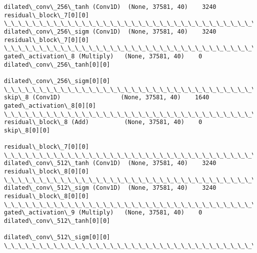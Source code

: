 \documentclass[11pt]{article}
\begin{document}
\begin{Verbatim}[commandchars=\\\{\}]
dilated\_conv\_256\_tanh (Conv1D)  (None, 37581, 40)    3240        residual\_block\_7[0][0]           
\_\_\_\_\_\_\_\_\_\_\_\_\_\_\_\_\_\_\_\_\_\_\_\_\_\_\_\_\_\_\_\_\_\_\_\_\_\_\_\_\_\_\_\_\_\_\_\_\_\_\_\_\_\_\_\_\_\_\_\_\_\_\_\_\_\_\_\_\_\_\_\_\_\_\_\_\_\_\_\_\_\_\_\_\_\_\_\_\_\_\_\_\_\_\_\_\_\_
dilated\_conv\_256\_sigm (Conv1D)  (None, 37581, 40)    3240        residual\_block\_7[0][0]           
\_\_\_\_\_\_\_\_\_\_\_\_\_\_\_\_\_\_\_\_\_\_\_\_\_\_\_\_\_\_\_\_\_\_\_\_\_\_\_\_\_\_\_\_\_\_\_\_\_\_\_\_\_\_\_\_\_\_\_\_\_\_\_\_\_\_\_\_\_\_\_\_\_\_\_\_\_\_\_\_\_\_\_\_\_\_\_\_\_\_\_\_\_\_\_\_\_\_
gated\_activation\_8 (Multiply)   (None, 37581, 40)    0           dilated\_conv\_256\_tanh[0][0]      
                                                                 dilated\_conv\_256\_sigm[0][0]      
\_\_\_\_\_\_\_\_\_\_\_\_\_\_\_\_\_\_\_\_\_\_\_\_\_\_\_\_\_\_\_\_\_\_\_\_\_\_\_\_\_\_\_\_\_\_\_\_\_\_\_\_\_\_\_\_\_\_\_\_\_\_\_\_\_\_\_\_\_\_\_\_\_\_\_\_\_\_\_\_\_\_\_\_\_\_\_\_\_\_\_\_\_\_\_\_\_\_
skip\_8 (Conv1D)                 (None, 37581, 40)    1640        gated\_activation\_8[0][0]         
\_\_\_\_\_\_\_\_\_\_\_\_\_\_\_\_\_\_\_\_\_\_\_\_\_\_\_\_\_\_\_\_\_\_\_\_\_\_\_\_\_\_\_\_\_\_\_\_\_\_\_\_\_\_\_\_\_\_\_\_\_\_\_\_\_\_\_\_\_\_\_\_\_\_\_\_\_\_\_\_\_\_\_\_\_\_\_\_\_\_\_\_\_\_\_\_\_\_
residual\_block\_8 (Add)          (None, 37581, 40)    0           skip\_8[0][0]                     
                                                                 residual\_block\_7[0][0]           
\_\_\_\_\_\_\_\_\_\_\_\_\_\_\_\_\_\_\_\_\_\_\_\_\_\_\_\_\_\_\_\_\_\_\_\_\_\_\_\_\_\_\_\_\_\_\_\_\_\_\_\_\_\_\_\_\_\_\_\_\_\_\_\_\_\_\_\_\_\_\_\_\_\_\_\_\_\_\_\_\_\_\_\_\_\_\_\_\_\_\_\_\_\_\_\_\_\_
dilated\_conv\_512\_tanh (Conv1D)  (None, 37581, 40)    3240        residual\_block\_8[0][0]           
\_\_\_\_\_\_\_\_\_\_\_\_\_\_\_\_\_\_\_\_\_\_\_\_\_\_\_\_\_\_\_\_\_\_\_\_\_\_\_\_\_\_\_\_\_\_\_\_\_\_\_\_\_\_\_\_\_\_\_\_\_\_\_\_\_\_\_\_\_\_\_\_\_\_\_\_\_\_\_\_\_\_\_\_\_\_\_\_\_\_\_\_\_\_\_\_\_\_
dilated\_conv\_512\_sigm (Conv1D)  (None, 37581, 40)    3240        residual\_block\_8[0][0]           
\_\_\_\_\_\_\_\_\_\_\_\_\_\_\_\_\_\_\_\_\_\_\_\_\_\_\_\_\_\_\_\_\_\_\_\_\_\_\_\_\_\_\_\_\_\_\_\_\_\_\_\_\_\_\_\_\_\_\_\_\_\_\_\_\_\_\_\_\_\_\_\_\_\_\_\_\_\_\_\_\_\_\_\_\_\_\_\_\_\_\_\_\_\_\_\_\_\_
gated\_activation\_9 (Multiply)   (None, 37581, 40)    0           dilated\_conv\_512\_tanh[0][0]      
                                                                 dilated\_conv\_512\_sigm[0][0]      
\_\_\_\_\_\_\_\_\_\_\_\_\_\_\_\_\_\_\_\_\_\_\_\_\_\_\_\_\_\_\_\_\_\_\_\_\_\_\_\_\_\_\_\_\_\_\_\_\_\_\_\_\_\_\_\_\_\_\_\_\_\_\_\_\_\_\_\_\_\_\_\_\_\_\_\_\_\_\_\_\_\_\_\_\_\_\_\_\_\_\_\_\_\_\_\_\_\_

\end{Verbatim}
\end{document}
